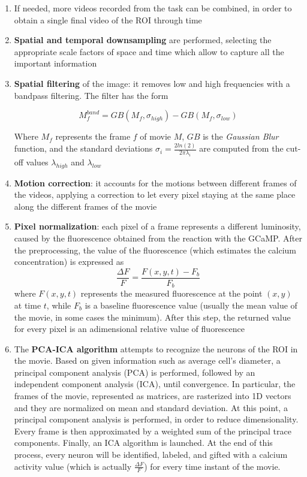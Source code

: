 \documentclass[12pt, a4paper]{report}
\begin{document}
\begin{enumerate}
	
	\item If needed, more videos recorded from the task can be combined, in order to obtain a single final video of the ROI through time
	
	\item \textbf{Spatial and temporal downsampling} are performed, selecting the appropriate scale factors of space and time which allow to capture all the important information
	
	\item \textbf{Spatial filtering} of the image: it removes low and high frequencies with a bandpass filtering. The filter has the form
	
	$$ M_f^{band} = GB(M_f,\sigma_{high}) - GB(M_f,\sigma_{low})$$
	
	Where $M_f$  represents the frame $f$ of movie $M$, $GB$ is the \textit{Gaussian Blur} function, and the standard deviations $ \sigma_i = \frac{2 ln(2)}{2 \pi \lambda_i}$ are computed from the cut-off values $ \lambda_{high}$ and $ \lambda_{low}$
	
	\item \textbf{Motion correction}: it accounts for the motions between different frames of the videos, applying a correction to let every pixel staying at the same place along the different frames of the movie
	
	\item \textbf{Pixel normalization}: each pixel of a frame represents a different luminosity, caused by the fluorescence obtained from the reaction with the GCaMP. After the preprocessing, the value of the fluorescence (which estimates the calcium concentration) is expressed as 
	$$\frac{\Delta F }{F} = \frac{F(x,y,t) - F_b}{F_b}$$
	where $F(x,y,t)$ represents the measured fluorescence at the point $(x,y)$ at time $t$, while $F_b$ is a baseline fluorescence value (usually the mean value of the movie, in some cases the minimum). After this step, the returned value for every pixel is an adimensional relative value of fluorescence
	
	\item The \textbf{PCA-ICA algorithm} attempts to recognize the neurons of the ROI in the movie. Based on given information such as average cell's diameter, a principal component analysis (PCA) is performed, followed by an independent component analysis (ICA), until convergence. In particular, the frames of the movie, represented as matrices, are rasterized into 1D vectors and they are normalized on mean and standard deviation. At this point, a principal component analysis is performed, in order to reduce dimensionality. Every frame is then approximated by a weighted sum of the principal trace components. Finally, an ICA algorithm is launched. At the end of this process, every neuron will be identified, labeled, and gifted with a calcium activity value (which is actually  $\frac{\Delta F }{F}$) for every time instant of the movie. 
	

\end{enumerate}
\end{document}
